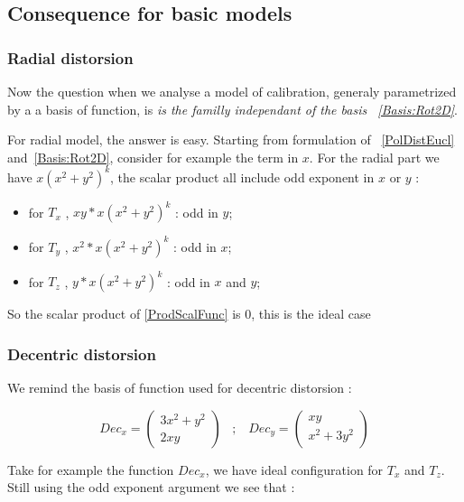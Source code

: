 
\subsection{Consequence for basic models}

\subsubsection{Radial distorsion}

Now the question when we analyse a model of calibration, generaly parametrized by a
a basis of function, is \emph{is the familly independant of the basis ~\ref{Basis:Rot2D}}.

For radial model, the answer is easy. Starting from formulation of ~\ref{PolDistEucl}
and~\ref{Basis:Rot2D}, consider for example the term in $x$. For the radial part
we have $x (x^2+y^2)^k$, the scalar product all include odd exponent in $x$ or $y$ :

\begin{itemize}
	\item for $T_x$ ,  $x y * x (x^2+y^2)^k$  : odd in $y$;
	\item for $T_y$ ,  $x^2 * x (x^2+y^2)^k$  : odd in $x$;
	\item for $T_z$ ,  $y  * x  (x^2+y^2)^k$  : odd in $x$ and $y$;
\end{itemize}

So the scalar product of \ref{ProdScalFunc} is $0$, this is the ideal case 


\subsubsection{Decentric distorsion}

We remind the basis of function used for decentric distorsion :

\begin{equation}
	  Dec_x = \begin{pmatrix} 3 x^2 + y^2 \\ 2  x y  \end{pmatrix}
\;\;\;  ; \;\;\;  
	  Dec_y = \begin{pmatrix}  x y   \\  x^2 + 3 y^2  \end{pmatrix}
\end{equation}

Take for example the function $Dec_x$,  we have ideal configuration for $T_x$ and $T_z$.
Still using the odd exponent argument we see that :


